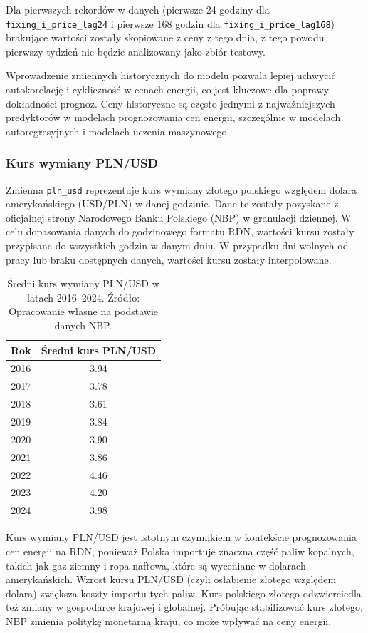 Dla pierwszych rekordów w danych (pierwsze 24 godziny dla \texttt{fixing\_i\_price\_lag24} i pierwsze 168 godzin dla \texttt{fixing\_i\_price\_lag168}) brakujące wartości zostały skopiowane z ceny z tego dnia, z tego powodu pierwszy tydzień nie będzie analizowany jako zbiór testowy.

Wprowadzenie zmiennych historycznych do modelu pozwala lepiej uchwycić autokorelację i cykliczność w cenach energii, co jest kluczowe dla poprawy dokładności prognoz. Ceny historyczne są często jednymi z najważniejszych predyktorów w modelach prognozowania cen energii, szczególnie w modelach autoregresyjnych i modelach uczenia maszynowego.

\subsubsection{Kurs wymiany PLN/USD}
\label{subsec:pln_usd}

Zmienna \texttt{pln\_usd} reprezentuje kurs wymiany złotego polskiego względem dolara amerykańskiego (USD/PLN) w danej godzinie. Dane te zostały pozyskane z oficjalnej strony Narodowego Banku Polskiego (NBP) w granulacji dziennej. W celu dopasowania danych do godzinowego formatu RDN, wartości kursu zostały przypisane do wszystkich godzin w danym dniu. W przypadku dni wolnych od pracy lub braku dostępnych danych, wartości kursu zostały interpolowane.

\begin{table}[H]
    \centering
    \begin{tabular}{|c|c|}
    \hline
    \textbf{Rok} & \textbf{Średni kurs PLN/USD} \\ \hline
    2016 & 3.94 \\ \hline
    2017 & 3.78 \\ \hline
    2018 & 3.61 \\ \hline
    2019 & 3.84 \\ \hline
    2020 & 3.90 \\ \hline
    2021 & 3.86 \\ \hline
    2022 & 4.46 \\ \hline
    2023 & 4.20 \\ \hline
    2024 & 3.98 \\ \hline
    \end{tabular}
    \caption{Średni kurs wymiany PLN/USD w latach 2016--2024. Źródło: Opracowanie własne na podstawie danych NBP.}
    \label{tab:pln-usd-exchange-rate}
\end{table}

Kurs wymiany PLN/USD jest istotnym czynnikiem w kontekście prognozowania cen energii na RDN, ponieważ Polska importuje znaczną część paliw kopalnych, takich jak gaz ziemny i ropa naftowa, które są wyceniane w dolarach amerykańskich. Wzrost kursu PLN/USD (czyli osłabienie złotego względem dolara) zwiększa koszty importu tych paliw. Kurs polskiego złotego odzwierciedla też zmiany w gospodarce krajowej i globalnej. Próbując stabilizować kurs złotego, NBP zmienia politykę monetarną kraju, co może wpływać na ceny energii.